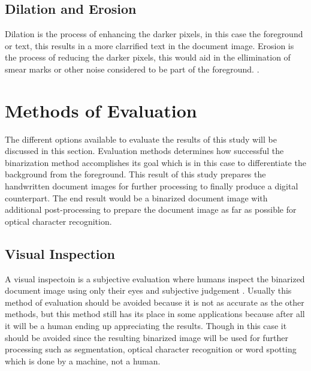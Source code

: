 \documentclass[11pt]{article}
\begin{document}
		\subsection{Dilation and Erosion}
			Dilation is the process of enhancing the darker pixels, in this case the foreground or text, this results in a more clarrified text in the document image. Erosion is the process of reducing the darker pixels, this would aid in the ellimination of smear marks or other noise considered to be part of the foreground. \cite{ntogas2008binarization}.


    \section{Methods of Evaluation}
		The different options available to evaluate the results of this study will be discussed in this section. Evaluation methods determines how successful the binarization method accomplishes its goal which is in this case to differentiate the background from the foreground. This result of this study prepares the handwritten document images for further processing to finally produce a digital counterpart. The end result would be a binarized document image with additional post-processing to prepare the document image as far as possible for optical character recognition.

		\subsection{Visual Inspection}
		A visual inspectoin is a subjective evaluation where humans inspect the binarized document image using only their eyes and subjective judgement \cite{ntirogiannis2013performance}. Usually this method of evaluation should be avoided because it is not as accurate as the other methods, but this method still has its place in some applications because after all it will be a human ending up appreciating the results. Though in this case it should be avoided since the resulting binarized image will be used for further processing such as segmentation, optical character recognition or word spotting which is done by a machine, not a human.
\end{document}

